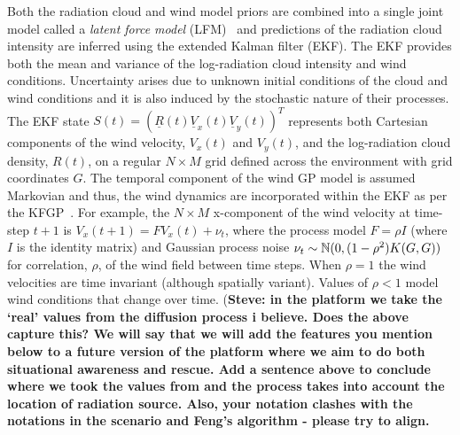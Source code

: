 Both the radiation cloud and wind model priors are combined into a single joint model called a {\it latent force model} (LFM)~\cite{alvarez09} and predictions of the radiation cloud intensity are inferred using the extended Kalman filter (EKF).  The EKF provides both the mean and variance of the log-radiation cloud intensity and wind conditions.  Uncertainty arises due to unknown initial conditions of the cloud and wind conditions and it is also induced by the stochastic nature of their processes.  The EKF state $S(t)=(\underline{R}(t) \underline{V}_x(t) \underline{V}_y(t))^T$ represents both Cartesian components of the wind velocity, $V_x(t)$ and $V_y(t)$, and the log-radiation cloud density, $R(t)$, on a regular $N\times M$ grid defined across the environment with grid coordinates $G$.  The temporal component of the wind GP model is assumed Markovian and thus, the wind dynamics are incorporated within the EKF as per the KFGP~\cite{reece10}.  For example, the $N\times M$ x-component of the wind velocity at time-step $t+1$ is $V_x(t+1)=F V_x(t)+\nu_t$, where the process model $F=\rho I$ (where $I$ is the identity matrix) and Gaussian process noise $\nu_t\sim \Bbb{N}(0,(1-\rho^2) K(G,G))$ for correlation, $\rho$, of the wind field between time steps.  When $\rho=1$ the wind velocities are time invariant (although spatially variant).  Values of $\rho<1$ model wind conditions that change over time.
(\textbf{Steve: in the platform we take the `real' values from the diffusion process i believe. Does the above capture this? We will say that we will add the features you mention below to a future version of the platform where we aim to do both situational awareness and rescue. Add a sentence above to conclude where we took the values from and the process takes into account the  location of radiation source. Also, your notation clashes with the notations in the scenario and Feng's algorithm - please try to align.}
